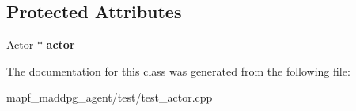 \subsection*{Protected Attributes}
\begin{DoxyCompactItemize}
\item 
\mbox{\label{classActorFixture_aed705c61fa62dcb2db1f311e99a3ad39}} 
\hyperlink{classActor}{Actor} $\ast$ {\bfseries actor}
\end{DoxyCompactItemize}


The documentation for this class was generated from the following file\+:\begin{DoxyCompactItemize}
\item 
mapf\+\_\+maddpg\+\_\+agent/test/test\+\_\+actor.\+cpp\end{DoxyCompactItemize}
